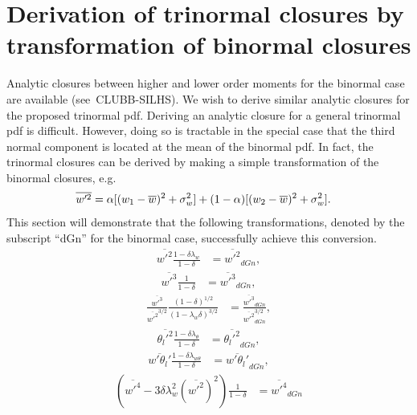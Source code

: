 \section{Derivation of trinormal closures by transformation of binormal closures}
\label{sec:transformationequations}

Analytic closures between higher and lower order moments for the binormal case
are available (see~CLUBB-SILHS\autocite{larson2022clubbsilhs}).
We wish to derive similar analytic closures for the proposed trinormal \gls{pdf}.
Deriving an analytic closure for a general trinormal \gls{pdf} is difficult.
However, doing so is tractable in the special case that the third normal component
is located at the mean of the binormal \gls{pdf}.
In fact, the trinormal closures can be derived
by making a simple transformation of the binormal closures\cite{larson2005using},
e.g.
\begin{align}
    \label{eq:wp2_bar_dGn}
    \overline{w'^2}
    &= \alpha [(w_1 - \overline{w})^2 + \sigma_w^2]
    + (1 - \alpha) [(w_2 - \overline{w})^2 + \sigma_w^2].
\end{align}
This section will demonstrate that the following transformations,
denoted by the subscript \enquote{dGn} for the binormal case,
successfully achieve this conversion.
\begin{align}
    \label{eq:w_prime_2_transform}
    \overline{w'^2} \frac{1 - \delta\lambda_w}{1 - \delta}
    &= \overline{w'^2}_{dGn},
\end{align}
\begin{align}
    \label{eq:w_prime_3_transform}
    \overline{w'^3} \frac{1}{1 - \delta}
    &= \overline{w'^3}_{dGn},
\end{align}
\begin{align}
    \label{eq:w_prime_3_div_w_prime_2_transform}
    \frac{\overline{w'^3}}{\overline{w'^2}^{3/2}} \frac{(1 - \delta)^{1/2}}{(1 - \lambda_w\delta)^{3/2}}
    &= \frac{\overline{w'^3}_{dGn}}{\overline{w'^2}_{dGn}^{3/2}},
\end{align}
\begin{align}
    \label{eq:theta_l_prime_transform}
    \overline{\theta_l'^2} \frac{1 - \delta\lambda_\theta}{1 - \delta}
    &= \overline{\theta_l'^2}_{dGn},
\end{align}
\begin{align}
    \label{eq:w_prime_theta_l_prime_transform}
    \overline{w'\theta_l'} \frac{1 - \delta\lambda_{w\theta}}{1 - \delta}
    &= \overline{w'\theta_l'}_{dGn},
\end{align}
\begin{align}
    \label{eq:w_prime_4_transform}
    \left(\overline{w'^4} - 3\delta\lambda_w^2 \left(\overline{w'^2}\right)^2\right) \frac{1}{1 - \delta}
    &= \overline{w'^4}_{dGn}
\end{align}
